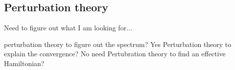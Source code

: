 \documentclass{article}
\begin{document}
\begin{comment}
    

Then,
\begin{equation}
    H|\psi(0)\rangle=|q_1\rangle(\frac{2+q_1}{\sqrt{w}})\sum_jc_j|e_j\rangle+|q_2\rangle(\frac{2+q_2}{\sqrt{1-w}})\sum_jc_j'|e_j\rangle
\end{equation}
or more generally,
\begin{equation}
    |\psi(t)\rangle=|q_1\rangle(\frac{2+q_1}{\sqrt{w}})\sum_jc_j|e_j\rangle+|q_2\rangle(\frac{2+q_2}{\sqrt{1-w}})\sum_jc_j'|e_j\rangle
\end{equation}

which is no longer separable, and by its factorizability by $|q_1\rangle$ and $|q_2\rangle$, we understand that for all $t$,
\begin{equation}
    |\psi(t)\rangle=\frac{1}{\sqrt{N}}(s_1|q_1\rangle|E_1(t)\rangle+s_2|q_2\rangle|E_2(t)\rangle)
\end{equation}
This means that the Schmidt decomposition of our system+env always has 2 nonzeros schmidt weights at most. But this decomposition (ie in terms of 2 states $|q_i\rangle |E_j\rangle$) is not immediately the 2 schmidt states. Indeed, Schmidt 1 starts up as $|\psi\rangle$ and evolves to something with most of its weight in a factor in from of $|q_1\rangle|E_1\rangle$. But of note, our pure state starts with nonzero value in 200+200 total eigenstates, the Schmidt states share theses with each other, 200 each. (Need to do a part where we look closer at evolution, see black board image.)

Note, $|E_i\rangle=\sum_jc_{ji}(t)|e_j\rangle$.
\end{comment}

\begin{comment}
Note that the weight in from of both states are equal if,
    \begin{equation}
        q_1=2(\frac{\sqrt{w}}{\sqrt{1-w}}-1)+q_2\frac{\sqrt{w}}{\sqrt{1-w}}
    \end{equation}
\end{comment}


\subsection{Perturbation theory}

Need to figure out what I am looking for...

perturbation theory to figure out the spectrum? Yes
Perturbation theory to explain the convergence? No need
Pertubration theory to find an effective Hamiltonian?
\end{document}
